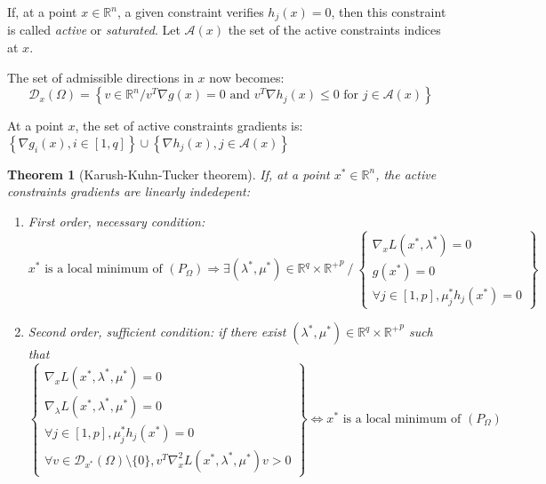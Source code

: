 \documentclass{article}
\newtheorem*{theorem}{Theorem}
\begin{document}
\noindent If, at a point $x\in\mathbb{R}^n$, a given constraint verifies $h_j(x)=0$, then this constraint is called \emph{active} or \emph{saturated}. Let $\mathcal{A}(x)$ the set of the active constraints indices at $x$.

\noindent The set of admissible directions in $x$ now becomes: 
\begin{equation*}
\mathcal{D}_{x}(\Omega) = \left\{ v\in
  \mathbb{R}^n / v^T \nabla g(x) = 0 \textrm{ and } v^T \nabla h_j(x)\leq 0 \textrm{ for }j\in \mathcal{A}(x) \right\}
\end{equation*}

\noindent At a point $x$, the set of active constraints gradients is: $\left\{ \nabla g_i(x), i\in [1,q] \right\} \cup \left\{ \nabla h_j(x), j\in \mathcal{A}(x) \right\}$

\begin{theorem}[Karush-Kuhn-Tucker theorem]
If, at a point $x^*\in\mathbb{R}^n$, the active constraints gradients  are linearly indedepent:
\begin{enumerate}
\item First order, necessary condition: 
\begin{equation*}
x^*\textrm{ is a local minimum of }\left(P_\Omega\right) \Rightarrow \exists \left(\lambda^*,\mu^* \right) \in \mathbb{R}^q\times {\mathbb{R}^+}^p \ / \
\left\{\begin{array}{c}
\nabla_x L(x^*,\lambda^*)=0 \\
g(x^*)=0\\
\forall j\in[1,p], \mu^*_j h_j(x^*) = 0
\end{array} \right\}
\end{equation*}
\item Second order, sufficient condition: if there exist $(\lambda^*,\mu^*) \in \mathbb{R}^q \times {\mathbb{R}^+}^p$ such that 
\begin{equation*}
\left\{\begin{array}{c}
\nabla_x L(x^*,\lambda^*,\mu^*)=0 \\
\nabla_\lambda L(x^*,\lambda^*,\mu^*)=0 \\
\forall j\in[1,p], \mu^*_j h_j(x^*) = 0\\
\forall v\in \mathcal{D}_{x^*}(\Omega)\setminus\{0\}, v^T \nabla_x^2
L(x^*,\lambda^*,\mu^*) v > 0 
\end{array}
\right\} \Leftrightarrow x^* \textrm{ is a local minimum of } 
\left(P_\Omega\right)
\end{equation*}
\end{enumerate}
\end{theorem}
\end{document}
